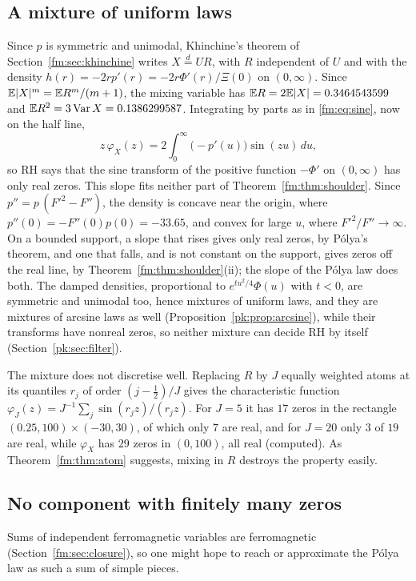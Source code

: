 \subsection{A mixture of uniform laws}\label{fm:sec:polyamix}

Since $p$ is symmetric and unimodal, Khinchine's theorem of Section~\ref{fm:sec:khinchine} writes $X\overset d=UR$, with $R$ independent of $U$ and with the density $h(r)=-2rp'(r)=-2r\Phi'(r)/\Xi(0)$ on $(0,\infty)$. Since $\mathbb{E}|X|^m=\mathbb{E} R^m/(m+1)$, the mixing variable has $\mathbb{E} R=2\mathbb{E}|X|=0.3464543599$ and $\mathbb{E} R^2=3\operatorname{Var}X=0.1386299587$. Integrating by parts as in \eqref{fm:eq:sine}, now on the half line,
\[
z\,\varphi_X(z)=2\int_0^\infty\big(-p'(u)\big)\sin(zu)\,du,
\]
so RH says that the sine transform of the positive function $-\Phi'$ on $(0,\infty)$ has only real zeros. This slope fits neither part of Theorem~\ref{fm:thm:shoulder}. Since $p''=p\,(F'^2-F'')$, the density is concave near the origin, where $p''(0)=-F''(0)p(0)=-33.65$, and convex for large $u$, where $F'^2/F''\to\infty$. On a bounded support, a slope that rises gives only real zeros, by P\'olya's theorem, and one that falls, and is not constant on the support, gives zeros off the real line, by Theorem~\ref{fm:thm:shoulder}(ii); the slope of the P\'olya law does both. The damped densities, proportional to $e^{tu^2/4}\Phi(u)$ with $t<0$, are symmetric and unimodal too, hence mixtures of uniform laws, and they are mixtures of arcsine laws as well (Proposition~\ref{pk:prop:arcsine}), while their transforms have nonreal zeros, so neither mixture can decide RH by itself (Section~\ref{pk:sec:filter}).

The mixture does not discretise well. Replacing $R$ by $J$ equally weighted atoms at its quantiles $r_j$ of order $(j-\frac12)/J$ gives the characteristic function $\varphi_J(z)=J^{-1}\sum_j\sin(r_jz)/(r_jz)$. For $J=5$ it has $17$ zeros in the rectangle $(0.25,100)\times(-30,30)$, of which only $7$ are real, and for $J=20$ only $3$ of $19$ are real, while $\varphi_X$ has $29$ zeros in $(0,100)$, all real (computed). As Theorem~\ref{fm:thm:atom} suggests, mixing in $R$ destroys the property easily.

\subsection{No component with finitely many zeros}\label{fm:sec:nosqrt}

Sums of independent ferromagnetic variables are ferromagnetic (Section~\ref{fm:sec:closure}), so one might hope to reach or approximate the P\'olya law as such a sum of simple pieces.

